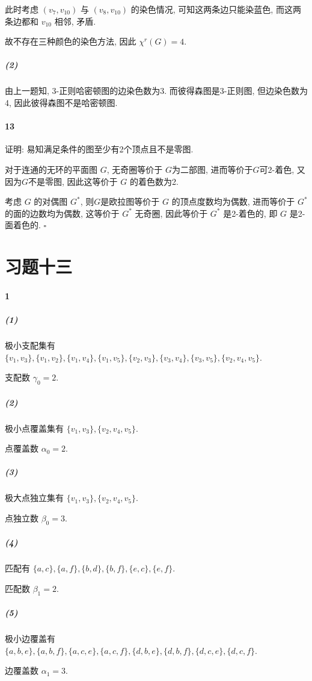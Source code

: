 \documentclass{ctexart}
\def\QED{\hfill $\square$}
\begin{document}
\medskip

此时考虑 $(v_7,v_{10})$ 与 $(v_8,v_{10})$ 的染色情况, 可知这两条边只能染蓝色,
而这两条边都和 $v_{10}$ 相邻, 矛盾.

故不存在三种颜色的染色方法, 因此 $\chi^r(G)=4$.

\subparagraph*{(2)} 由上一题知, 3-正则哈密顿图的边染色数为3.
而彼得森图是3-正则图, 但边染色数为4, 因此彼得森图不是哈密顿图.


\paragraph*{13} 证明: 易知满足条件的图至少有2个顶点且不是零图.

对于连通的无环的平面图 $G$, 无奇圈等价于 $G$为二部图,
进而等价于$G$可2-着色, 又因为$G$不是零图, 因此这等价于 $G$ 的着色数为2.

考虑 $G$ 的对偶图 $G^*$, 则$G$是欧拉图等价于 $G$ 的顶点度数均为偶数,
进而等价于 $G^*$ 的面的边数均为偶数, 这等价于 $G^*$ 无奇圈,
因此等价于 $G^*$ 是2-着色的, 即 $G$ 是2-面着色的. \QED

\newpage

\section*{习题十三}

\paragraph*{1}

\subparagraph*{(1)} 极小支配集有 $\{v_1,v_3\}, \{v_1,v_2\},
    \{v_1,v_4\}, \{v_1,v_5\}, \{v_2,v_3\}, \{v_3,v_4\},
    \{v_3,v_5\}, \{v_2,v_4,v_5\}$.

支配数 $\gamma_0=2$.

\subparagraph*{(2)} 极小点覆盖集有 $\{v_1,v_3\}, \{v_2,v_4,v_5\}$.

点覆盖数 $\alpha_0=2$.

\subparagraph*{(3)} 极大点独立集有 $\{v_1,v_3\}, \{v_2,v_4,v_5\}$.

点独立数 $\beta_0=3$.

\subparagraph*{(4)} 匹配有 $\{a,c\}, \{a,f\}, \{b,d\}, \{b,f\},
    \{e,c\}, \{e,f\}$.

匹配数 $\beta_1=2$.


\subparagraph*{(5)} 极小边覆盖有 $\{a,b,e\}, \{a,b,f\}, \{a,c,e\},
    \{a,c,f\}, \{d,b,e\}, \{d,b,f\}, \{d,c,e\}, \{d,c,f\}$.

边覆盖数 $\alpha_1=3$.
\end{document}
